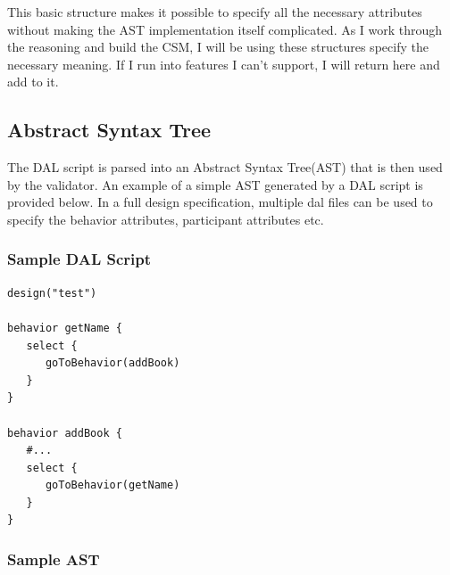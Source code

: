 This basic structure makes it possible to specify all the necessary attributes without making the AST implementation itself complicated. As I work through the reasoning and build the CSM, I will be using these structures specify the necessary meaning. If I run into features I can't support, I will return here and add to it. 

\subsection{Abstract Syntax Tree}

The DAL script is parsed into an Abstract Syntax Tree(AST) that is then used by the validator. An example of a simple AST generated by a DAL script is provided below. In a full design specification, multiple dal files can be used to specify the behavior attributes, participant attributes etc. 

\subsubsection{Sample DAL Script}
\begin{verbatim}
design("test")

behavior getName {
   select {
      goToBehavior(addBook)
   }
}

behavior addBook {
   #...
   select {
      goToBehavior(getName)
   }
}

\end{verbatim}

\subsubsection{Sample AST}

